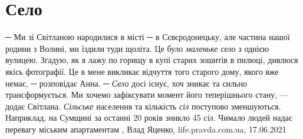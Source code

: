  
 
 
 
 
\chapter{Село}
\label{sec:slova.selo}

─ Ми зі Світланою народилися в місті ─ в Сєвєродонецьку, але частина нашої
родини з Волині, ми їздили туди щоліта. Це було \emph{маленьке село} з однією вулицею.
Згадую, як я лажу по горищу в купі старих зошитів в пилюці, дивлюся якісь
фотографії. Це в мене викликає відчуття того старого дому, якого вже немає, ─
розповідає Анна.  ─ \emph{Село} досі існує, хоч зникає та сильно трансформується. Ми
хочемо зафіксувати момент його теперішнього стану, — додає Світлана.  \emph{Сільське}
населення та кількість \emph{сіл} поступово зменшуються. Наприклад, на Сумщині за
останні 20 років зникло 45 \emph{сіл}. Чимало людей надає перевагу міським
апартаментам
, 
Влад Яценко, life.pravda.com.ua, 17.06.2021
